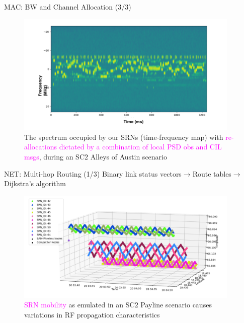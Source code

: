 \documentclass{beamer}
\begin{document}
\begin{frame}{MAC: BW and Channel Allocation (3/3)}
\begin{figure}
    \centering
    \includegraphics[width = 0.95\textwidth]{Alleys_of_Austin_Channel_Access.PNG}
    \caption{The spectrum occupied by our SRNs (time-frequency map) with \textcolor{magenta}{re-allocations dictated by a combination of local PSD obs and CIL msgs}, during an SC$2$ Alleys of Austin scenario}
    \label{fig:14}
\end{figure}
\end{frame}
\begin{frame}{NET: Multi-hop Routing (1/3)}
Binary link status vectors$\rightarrow$Route tables$\rightarrow$Dijkstra's algorithm
\begin{figure}
    \centering
    \includegraphics[width = 0.95\textwidth]{Payline_Node_GPS_Locations.PNG}
    \caption{\textcolor{magenta}{SRN mobility} as emulated in an SC$2$ Payline scenario causes variations in RF propagation characteristics}
    \label{fig:17}
\end{figure}
\end{frame}
\end{document}
